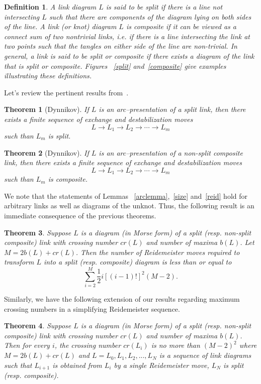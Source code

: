 \documentclass{amsart}
\newtheorem{theorem}{Theorem}
\newtheorem{definition}{Definition}
\begin{document}
\begin{definition}
A link diagram $L$ is said to be \emph{split} if there is a line not intersecting $L$ such that there are components of the diagram lying on both sides of the line. A link (or knot) diagram $L$ is \emph{composite} if it can be viewed as a connect sum of two nontrivial links, i.e. if there is a line intersecting the link at two points such that the tangles on either side of the line are non-trivial. In general, a link is said to be split or composite if there exists a diagram of the link that is split or composite. Figures ~\ref{split} and~\ref{composite} give examples illustrating these definitions.
\end{definition}

Let's review the pertinent results from~\cite{dynnikov}.

\begin{theorem}[Dynnikov]
If $L$ is an arc--presentation of a split link, then there exists a finite sequence of exchange and destabilization moves $$L\rightarrow L_1\rightarrow L_2\rightarrow
\cdots\rightarrow L_m$$ such than $L_m$ is split.\end{theorem}

\begin{theorem}[Dynnikov]
If $L$ is an arc--presentation of a non-split composite link, then there exists a finite sequence of exchange and destabilization moves $$L\rightarrow L_1\rightarrow L_2\rightarrow
\cdots\rightarrow L_m$$ such than $L_m$ is composite.\end{theorem}

We note that the statements of Lemmas ~\ref{arclemma},~\ref{size} and~\ref{reid} hold for arbitrary links as well as diagrams of the unknot. Thus, the following result is an immediate consequence of the previous theorems.

\begin{theorem}
Suppose $L$ is a diagram (in Morse form) of a split (resp. non-split composite) link with crossing number $cr(L)$ and number of maxima $b(L)$. Let $M=2b(L)+cr(L)$. Then the number of Reidemeister moves required to transform $L$ into a split (resp. composite) diagram is less than or equal to $$\sum_{i=2}^M\frac{1}{2}i[(i-1)!]^2(M-2).$$
\end{theorem}

Similarly, we have the following extension of our results regarding maximum crossing numbers in a simplifying Reidemeister sequence.

\begin{theorem}
Suppose $L$ is a diagram (in Morse form) of a split (resp. non-split composite) link with crossing number $cr(L)$ and number of maxima $b(L)$. Then for every $i$, the crossing number $cr(L_i)$ is no more than $(M-2)^2$ where $M=2b(L)+cr(L)$ and $L=L_0, L_1, L_2, ..., L_N$ is a sequence of link diagrams such that $L_{i+1}$ is obtained from $L_i$ by a single Reidemeister move, $L_N$ is split (resp. composite).
\end{theorem}
\end{document}

